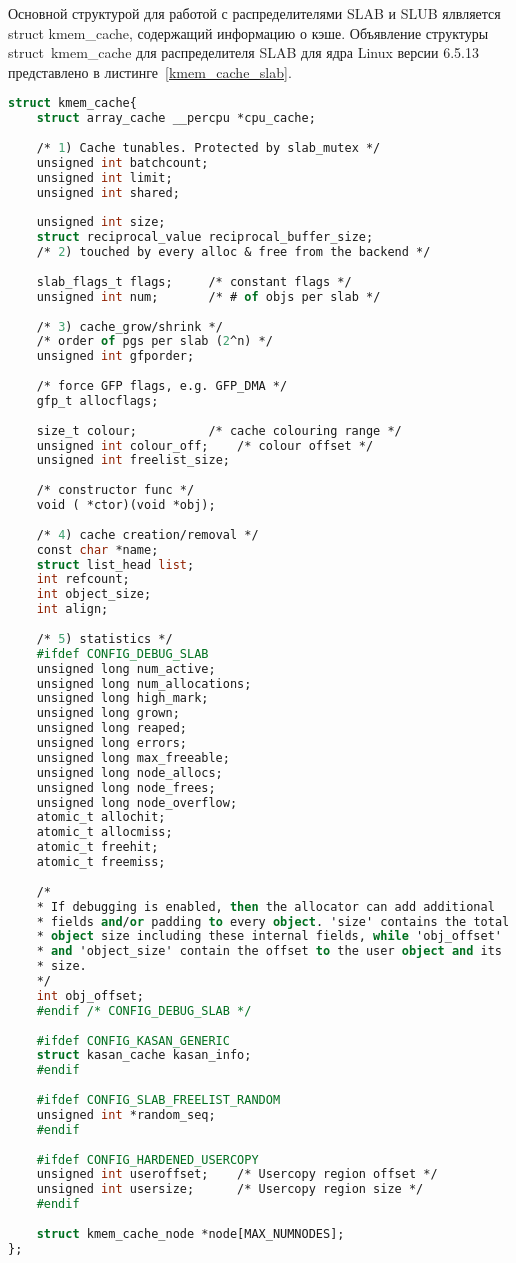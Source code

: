 Основной структурой для работой с распределителями SLAB и SLUB ялвляется struct kmem\_cache, содержащий информацию о кэше. Объявление структуры struct~kmem\_cache для распределителя SLAB для ядра Linux версии 6.5.13 представлено в листинге~\ref{kmem_cache_slab}.
	\begin{lstlisting}[label=kmem_cache_slab,caption=Объявление структуры struct~kmem\_cache для распределителя SLAB (версия ядра Linux~--- 6.5.13),language=Caml]
struct kmem_cache{
	struct array_cache __percpu *cpu_cache;
	
	/* 1) Cache tunables. Protected by slab_mutex */
	unsigned int batchcount;
	unsigned int limit;
	unsigned int shared;
	
	unsigned int size;
	struct reciprocal_value reciprocal_buffer_size;
	/* 2) touched by every alloc & free from the backend */
	
	slab_flags_t flags;		/* constant flags */
	unsigned int num;		/* # of objs per slab */
	
	/* 3) cache_grow/shrink */
	/* order of pgs per slab (2^n) */
	unsigned int gfporder;
	
	/* force GFP flags, e.g. GFP_DMA */
	gfp_t allocflags;
	
	size_t colour;			/* cache colouring range */
	unsigned int colour_off;	/* colour offset */
	unsigned int freelist_size;
	
	/* constructor func */
	void ( *ctor)(void *obj);
	
	/* 4) cache creation/removal */
	const char *name;
	struct list_head list;
	int refcount;
	int object_size;
	int align;
	
	/* 5) statistics */
	#ifdef CONFIG_DEBUG_SLAB
	unsigned long num_active;
	unsigned long num_allocations;
	unsigned long high_mark;
	unsigned long grown;
	unsigned long reaped;
	unsigned long errors;
	unsigned long max_freeable;
	unsigned long node_allocs;
	unsigned long node_frees;
	unsigned long node_overflow;
	atomic_t allochit;
	atomic_t allocmiss;
	atomic_t freehit;
	atomic_t freemiss;
	
	/*
	* If debugging is enabled, then the allocator can add additional
	* fields and/or padding to every object. 'size' contains the total
	* object size including these internal fields, while 'obj_offset'
	* and 'object_size' contain the offset to the user object and its
	* size.
	*/
	int obj_offset;
	#endif /* CONFIG_DEBUG_SLAB */
	
	#ifdef CONFIG_KASAN_GENERIC
	struct kasan_cache kasan_info;
	#endif
	
	#ifdef CONFIG_SLAB_FREELIST_RANDOM
	unsigned int *random_seq;
	#endif
	
	#ifdef CONFIG_HARDENED_USERCOPY
	unsigned int useroffset;	/* Usercopy region offset */
	unsigned int usersize;		/* Usercopy region size */
	#endif
	
	struct kmem_cache_node *node[MAX_NUMNODES];
};
	\end{lstlisting}

